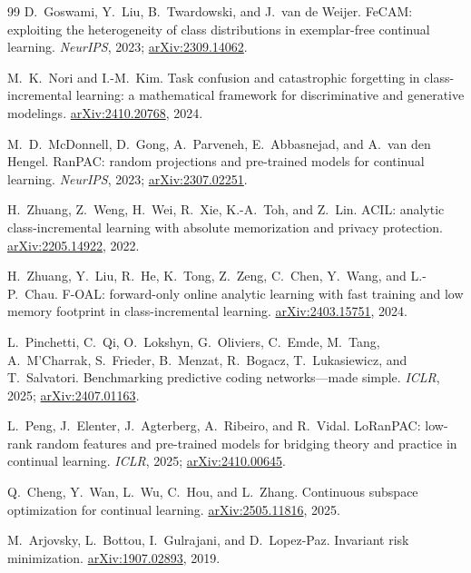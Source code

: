 \documentclass[11pt]{article}
\begin{document}
\begin{thebibliography}{99}
 D.~Goswami, Y.~Liu, B.~Twardowski, and
J.~van de Weijer.
FeCAM: exploiting the heterogeneity of class distributions in
exemplar-free continual learning.
\emph{NeurIPS}, 2023;
\href{https://arxiv.org/abs/2309.14062}{arXiv:2309.14062}.

 M.~K.~Nori and I.-M.~Kim.
Task confusion and catastrophic forgetting in class-incremental learning:
a mathematical framework for discriminative and generative modelings.
\href{https://arxiv.org/abs/2410.20768}{arXiv:2410.20768}, 2024.

 M.~D.~McDonnell, D.~Gong, A.~Parveneh,
E.~Abbasnejad, and A.~van den Hengel.
RanPAC: random projections and pre-trained models for continual learning.
\emph{NeurIPS}, 2023;
\href{https://arxiv.org/abs/2307.02251}{arXiv:2307.02251}.

 H.~Zhuang, Z.~Weng, H.~Wei, R.~Xie,
K.-A.~Toh, and Z.~Lin.
ACIL: analytic class-incremental learning with absolute memorization and
privacy protection.
\href{https://arxiv.org/abs/2205.14922}{arXiv:2205.14922}, 2022.

 H.~Zhuang, Y.~Liu, R.~He, K.~Tong,
Z.~Zeng, C.~Chen, Y.~Wang, and L.-P.~Chau.
F-OAL: forward-only online analytic learning with fast training and low
memory footprint in class-incremental learning.
\href{https://arxiv.org/abs/2403.15751}{arXiv:2403.15751}, 2024.

 L.~Pinchetti, C.~Qi, O.~Lokshyn,
G.~Oliviers, C.~Emde, M.~Tang, A.~M'Charrak, S.~Frieder,
B.~Menzat, R.~Bogacz, T.~Lukasiewicz, and T.~Salvatori.
Benchmarking predictive coding networks---made simple.
\emph{ICLR}, 2025;
\href{https://arxiv.org/abs/2407.01163}{arXiv:2407.01163}.

 L.~Peng, J.~Elenter, J.~Agterberg,
A.~Ribeiro, and R.~Vidal.
LoRanPAC: low-rank random features and pre-trained models for bridging
theory and practice in continual learning.
\emph{ICLR}, 2025;
\href{https://arxiv.org/abs/2410.00645}{arXiv:2410.00645}.

 Q.~Cheng, Y.~Wan, L.~Wu, C.~Hou, and
L.~Zhang.
Continuous subspace optimization for continual learning.
\href{https://arxiv.org/abs/2505.11816}{arXiv:2505.11816}, 2025.

 M.~Arjovsky, L.~Bottou, I.~Gulrajani, and
D.~Lopez-Paz.
Invariant risk minimization.
\href{https://arxiv.org/abs/1907.02893}{arXiv:1907.02893}, 2019.


\end{thebibliography}
\end{document}
